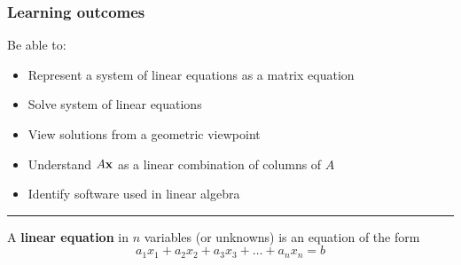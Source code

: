 %





\subsubsection*{Learning outcomes}
Be able to:
\begin{itemize}
	\item Represent a system of linear equations as a matrix equation
	 \item Solve system of linear equations
	 \item View solutions from a geometric viewpoint
	 \item Understand $A{\bf x}$ as a linear combination of columns of $A$
	 \item Identify software used in linear algebra
	
\end{itemize}





\rule[0.01in]{\textwidth}{0.0025in}




A \textbf{linear equation} in $n$ variables (or unknowns) is an equation of the form
\[ a_1 x_1 + a_2 x_2 + a_3 x_3 + \dots + a_n x_n = b \]


